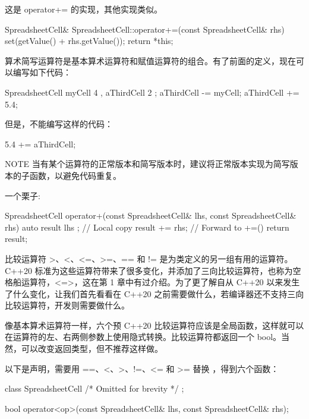 这是 operator+= 的实现，其他实现类似。

\begin{cpp}
SpreadsheetCell& SpreadsheetCell::operator+=(const SpreadsheetCell& rhs)
{
    set(getValue() + rhs.getValue());
    return *this;
}
\end{cpp}

算术简写运算符是基本算术运算符和赋值运算符的组合。有了前面的定义，现在可以编写如下代码：

\begin{cpp}
SpreadsheetCell myCell { 4 }, aThirdCell { 2 };
aThirdCell -= myCell;
aThirdCell += 5.4;
\end{cpp}

但是，不能编写这样的代码：

\begin{cpp}
5.4 += aThirdCell;
\end{cpp}

\begin{myNotic}{NOTE}
当有某个运算符的正常版本和简写版本时，建议将正常版本实现为简写版本的子函数，以避免代码重复。
\end{myNotic}

一个栗子:

\begin{cpp}
SpreadsheetCell operator+(const SpreadsheetCell& lhs, const SpreadsheetCell& rhs)
{
    auto result { lhs }; // Local copy
    result += rhs; // Forward to +=()
    return result;
}
\end{cpp}


比较运算符 >、<、<=、>=、== 和 != 是为类定义的另一组有用的运算符。C++20 标准为这些运算符带来了很多变化，并添加了三向比较运算符，也称为空格船运算符，<=>，这在第 1 章中有过介绍。为了更了解自从 C++20 以来发生了什么变化，让我们首先看看在 C++20 之前需要做什么，若编译器还不支持三向比较运算符，开发则需要做什么。


像基本算术运算符一样，六个预 C++20 比较运算符应该是全局函数，这样就可以在运算符的左、右两侧参数上使用隐式转换。比较运算符都返回一个 bool。当然，可以改变返回类型，但不推荐这样做。

以下是声明，需要用 ==、<、>、!=、<= 和 >= 替换 ，得到六个函数：

\begin{cpp}
class SpreadsheetCell { /* Omitted for brevity */ };

bool operator<op>(const SpreadsheetCell& lhs, const SpreadsheetCell& rhs);
\end{cpp}

